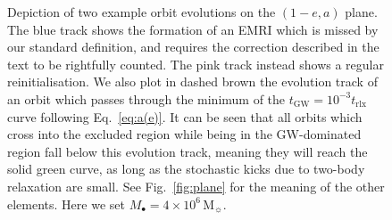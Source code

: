 \documentclass[desactivate]{aa}
\begin{document}
        \begin{figure}
            \centering
            \caption{Depiction of two example orbit evolutions on the $(1-e,a)$ plane. The blue track shows the formation of an EMRI which is missed by our standard definition, and requires the correction described in the text to be rightfully counted. The pink track instead shows a regular reinitialisation. We also plot in dashed brown the evolution track of an orbit which passes through the minimum of the $t_\mathrm{GW} = 10^{-3} t_\mathrm{rlx}$ curve following Eq.\ \eqref{eq:a(e)}. It can be seen that all orbits which cross into the excluded region while being in the GW-dominated region fall below this evolution track, meaning they will reach the solid green curve, as long as the stochastic kicks due to two-body relaxation are small. See Fig.\ \ref{fig:plane} for the meaning of the other elements. Here we set $M_\bullet = 4 \times 10^6 \, \mathrm{M}_\sun$.}
            \label{fig:reinit}
        \end{figure}
\end{document}
